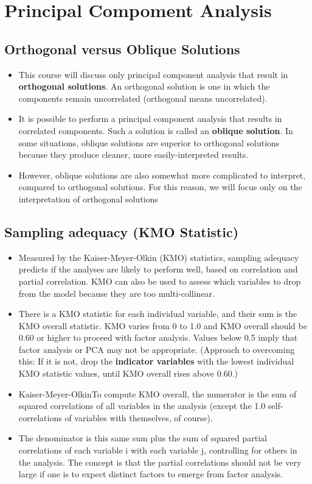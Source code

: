 \documentclass[a4paper,12pt]{article}
\begin{document}
	
\tableofcontents
\section{Principal Compoment Analysis}
\subsection{Orthogonal versus Oblique Solutions}
\begin{itemize}
\item This course will discuss only principal component analysis that result in \textbf{orthogonal solutions}.
An orthogonal solution is one in which the components remain uncorrelated (orthogonal means
uncorrelated).

\item It is possible to perform a principal component analysis that results in correlated components.
Such a solution is called an \textbf{oblique solution}.  In some situations, oblique solutions are superior
to orthogonal solutions because they produce cleaner, more easily-interpreted results.
\item However, oblique solutions are also somewhat more complicated to interpret, compared to
orthogonal solutions.  For this reason, we will focus only on the interpretation of orthogonal solutions
\end{itemize}

	
\subsection{Sampling adequacy (KMO Statistic)}
\begin{itemize}
\item Measured by the Kaiser-Meyer-Olkin (KMO) statistics, sampling adequacy predicts if the analyses are likely to perform well, based on correlation and partial correlation. KMO can also be used to assess which variables to drop from the model because they are too multi-collinear.

\item There is a KMO statistic for each individual variable, and their sum is the KMO overall statistic. KMO varies from 0 to 1.0 and KMO overall should be 0.60 or higher to proceed with factor analysis. Values below 0.5 imply that factor analysis or PCA may not be appropriate. (Approach to overcoming this: If it is not, drop the \textbf{indicator variables} with the lowest individual KMO statistic values, until KMO overall rises above 0.60.)

\item Kaiser-Meyer-OlkinTo compute KMO overall, the numerator is the sum of squared correlations of all variables in the analysis (except the 1.0 self-correlations of variables with themselves, of course). 

\item The denominator is this same sum plus the sum of squared partial correlations of each variable i with each variable j, controlling for others in the analysis. The concept is that the partial correlations should not be very large if one is to expect distinct factors to emerge from factor analysis.
\end{itemize}
\end{document}

